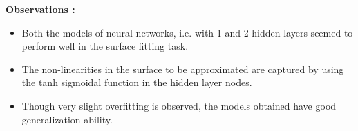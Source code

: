 \textbf{Observations :}
\begin{itemize}
\item Both the models of neural networks, i.e. with 1 and 2 hidden layers seemed to perform well in the surface fitting task.
\item The non-linearities in the surface to be approximated are captured by using the tanh sigmoidal function in the hidden layer nodes. 
\item Though very slight overfitting is observed, the models obtained have good generalization ability.  

\end{itemize}
